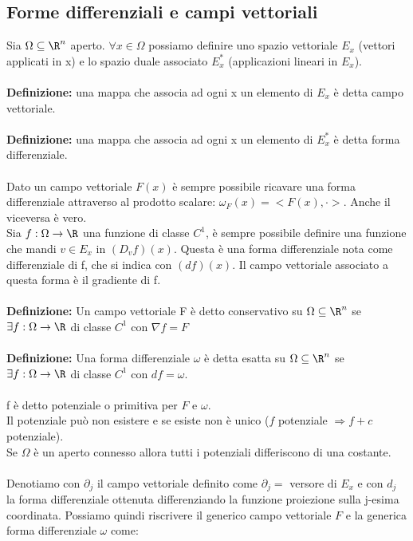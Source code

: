 \documentclass{article}
\begin{document}
\subsection{Forme differenziali e campi vettoriali}
Sia $\Omega\subseteq\R^n$ aperto. $\forall x\in\Omega$ possiamo definire uno spazio vettoriale $E_x$ (vettori applicati in x) e lo spazio duale associato $E^*_x$ (applicazioni lineari in $E_x$).\\\\
\textbf{Definizione:} una mappa che associa ad ogni x un elemento di $E_x$ è detta campo vettoriale.\\\\
\textbf{Definizione:} una mappa che associa ad ogni x un elemento di $E^*_x$ è detta forma differenziale.\\\\
Dato un campo vettoriale $F(x)$ è sempre possibile ricavare una forma differenziale attraverso al prodotto scalare: $\omega_F(x)=<F(x),\cdot>$. Anche il viceversa è vero.\\
Sia $f:\Omega\rightarrow\R$ una funzione di classe $C^1$, è sempre possibile definire una funzione che mandi $v\in E_x$ in $(D_vf)(x)$. Questa è una forma differenziale nota come differenziale di f, che si indica con $(df)(x)$. Il campo vettoriale associato a questa forma è il gradiente di f.\\\\ 
\textbf{Definizione:} Un campo vettoriale F è detto conservativo su $\Omega\subseteq\R^n$ se $\exists f:\Omega\rightarrow\R$ di classe $C^1$ con $\nabla f=F$\\\\
\textbf{Definizione:} Una forma differenziale $\omega$ è detta esatta su $\Omega\subseteq\R^n$ se $\exists f:\Omega\rightarrow\R$ di classe $C^1$ con $df=\omega$.\\\\
f è detto potenziale o primitiva per $F$ e $\omega$.\\
Il potenziale può non esistere e se esiste non è unico ($f$ potenziale $\Rightarrow f+c$ potenziale).\\
Se $\Omega$ è un aperto connesso allora tutti i potenziali differiscono di una costante.\\\\
Denotiamo con $\partial_j$ il campo vettoriale definito come $\partial_j=$ versore di $E_x$ e con $d_j$ la forma differenziale ottenuta differenziando la funzione proiezione sulla j-esima coordinata. Possiamo quindi riscrivere il generico campo vettoriale $F$ e la generica forma differenziale $\omega$ come:
\end{document}
